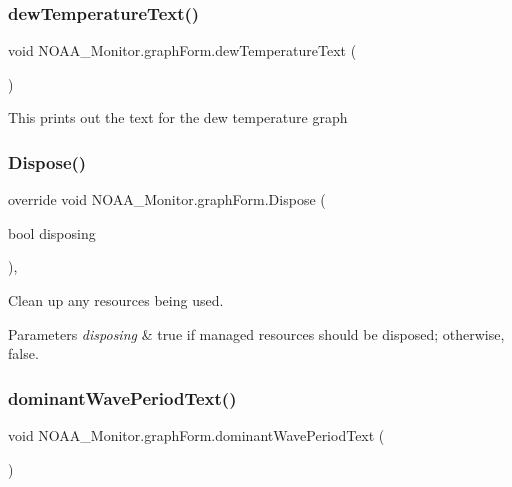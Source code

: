 \subsubsection{\texorpdfstring{dew\+Temperature\+Text()}{dewTemperatureText()}}
{\footnotesize\ttfamily void N\+O\+A\+A\+\_\+\+Monitor.\+graph\+Form.\+dew\+Temperature\+Text (\begin{DoxyParamCaption}{ }\end{DoxyParamCaption})\hspace{0.3cm}{\ttfamily [inline]}}

This prints out the text for the dew temperature graph \mbox{\label{class_n_o_a_a___monitor_1_1graph_form_af498ca1601a85b6ed47927f609d4cb80}} 
\subsubsection{\texorpdfstring{Dispose()}{Dispose()}}
{\footnotesize\ttfamily override void N\+O\+A\+A\+\_\+\+Monitor.\+graph\+Form.\+Dispose (\begin{DoxyParamCaption}\item[{bool}]{disposing }\end{DoxyParamCaption})\hspace{0.3cm}{\ttfamily [inline]}, {\ttfamily [protected]}}



Clean up any resources being used. 


\begin{DoxyParams}{Parameters}
{\em disposing} & true if managed resources should be disposed; otherwise, false.\\
\hline
\end{DoxyParams}
\mbox{\label{class_n_o_a_a___monitor_1_1graph_form_aff28dc3c6bea6ba1fc33f0620c83a277}} 
\subsubsection{\texorpdfstring{dominant\+Wave\+Period\+Text()}{dominantWavePeriodText()}}
{\footnotesize\ttfamily void N\+O\+A\+A\+\_\+\+Monitor.\+graph\+Form.\+dominant\+Wave\+Period\+Text (\begin{DoxyParamCaption}{ }\end{DoxyParamCaption})\hspace{0.3cm}{\ttfamily [inline]}}

